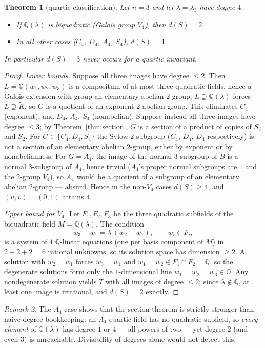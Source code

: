 \documentclass[11pt]{article}
\newtheorem{theorem}{Theorem}
\theoremstyle{definition}
\theoremstyle{remark}
\newtheorem{remark}[theorem]{Remark}
\newcommand{\Q}{\mathbb{Q}}
\newcommand{\Kt}{\widetilde{K}}
\begin{document}
\begin{theorem}[quartic classification]\label{thm:quartic}
Let $n = 3$ and let $\lambda = \lambda_3$ have degree $4$.
\begin{itemize}
\item If $\Q(\lambda)$ is biquadratic (Galois group $V_4$), then $d(S) = 2$.
\item In all other cases ($C_4$, $D_4$, $A_4$, $S_4$), $d(S) = 4$.
\end{itemize}
In particular $d(S) = 3$ never occurs for a quartic invariant.
\end{theorem}

\begin{proof}
\emph{Lower bounds.} Suppose all three images have degree $\le 2$. Then
$L = \Q(w_1, w_2, w_3)$ is a compositum of at most three quadratic fields, hence a Galois
extension with group an elementary abelian $2$-group; $L \supseteq \Q(\lambda)$ forces
$L \supseteq \Kt$, so $G$ is a quotient of an exponent-$2$ abelian group. This eliminates
$C_4$ (exponent), and $D_4$, $A_4$, $S_4$ (nonabelian). Suppose instead all three images have
degree $\le 3$; by Theorem~\ref{thm:section}, $G$ is a section of a product of copies of
$S_3$ and $S_2$. For $G \in \{C_4, D_4, S_4\}$ the Sylow $2$-subgroup ($C_4$, $D_4$, $D_4$
respectively) is not a section of an elementary abelian $2$-group, either by exponent or by
nonabelianness. For $G = A_4$: the image of the normal $3$-subgroup of $B$ is a normal
$3$-subgroup of $A_4$, hence trivial ($A_4$'s proper normal subgroups are $1$ and the
$2$-group $V_4$), so $A_4$ would be a quotient of a subgroup of an elementary abelian
$2$-group --- absurd. Hence in the non-$V_4$ cases $d(S) \ge 4$, and $(u,v) = (0,1)$ attains
$4$.

\emph{Upper bound for $V_4$.} Let $F_1, F_2, F_3$ be the three quadratic subfields of the
biquadratic field $M = \Q(\lambda)$. The condition
\[
w_3 - w_1 = \lambda\,(w_2 - w_1), \qquad w_i \in F_i,
\]
is a system of $4$ $\Q$-linear equations (one per basis component of $M$) in
$2 + 2 + 2 = 6$ rational unknowns, so its solution space has dimension $\ge 2$. A solution
with $w_2 = w_1$ forces $w_3 = w_1$ and $w_1 = w_2 \in F_1 \cap F_2 = \Q$, so the degenerate
solutions form only the $1$-dimensional line $w_1 = w_2 = w_3 \in \Q$. Any nondegenerate
solution yields $T$ with all images of degree $\le 2$; since $\lambda \notin \Q$, at least
one image is irrational, and $d(S) = 2$ exactly.
\end{proof}

\begin{remark}\label{rem:a4}
The $A_4$ case shows that the section theorem is strictly stronger than naive degree
bookkeeping: an $A_4$-quartic field has no quadratic subfield, so \emph{every element} of
$\Q(\lambda)$ has degree $1$ or $4$ --- all powers of two --- yet degree $2$ (and even $3$) is
unreachable. Divisibility of degrees alone would not detect this.
\end{remark}
\end{document}
